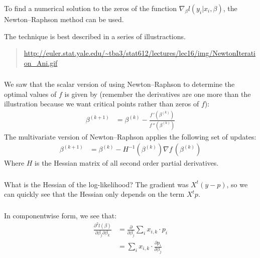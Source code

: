 \begin{frame}[fragile] \frametitle{}

To find a numerical solution to the zeros of the function
$\nabla_\beta l(y_i | x_i, \beta)$, the Newton–Raphson method
can be used.

\pause The technique is best described in a series of
illustractions.
\begin{quote}
\url{http://euler.stat.yale.edu/~tba3/stat612/lectures/lec16/img/NewtonIteration_Ani.gif}
\end{quote}

\end{frame}

\begin{frame}[fragile] \frametitle{}

We saw that the scalar version of using Newton–Raphson to determine
the optimal values of $f$ is given by (remember the derivatives are
one more than the illustration because we want critical points rather
than zeros of $f$):
\begin{align*}
\beta^{(k+1)} &= \beta^{(k)} - \frac{f\,'(\beta^{(k)})}{f\,''(\beta^{(k)})}
\end{align*}
\pause The multivariate version of Newton–Raphson applies the following
set of updates:
\begin{align*}
\beta^{(k+1)} &= \beta^{(k)} - H^{-1}(\beta^{(k)}) \nabla f\,(\beta^{(k)})
\end{align*}
Where $H$ is the Hessian matrix of all second order partial derivatives.

\end{frame}



\begin{frame}[fragile] \frametitle{}

What is the Hessian of the log-likelihood? The gradient
was $X^t (y - p)$, so we can quickly see that the
Hessian only depends on the term $X^t p$.

\end{frame}

\begin{frame}[fragile] \frametitle{}

In componentwise form, we see that:
\begin{align*}
\frac{\partial^2 l(\beta)}{\partial \beta_j \partial \beta_k}
&= \frac{\partial}{\partial \beta_j} \sum_i x_{i,k} \cdot p_i \\
&= \sum_i x_{i,k} \cdot \frac{\partial p_i}{\partial \beta_j} \\
\end{align*}

\end{frame}


